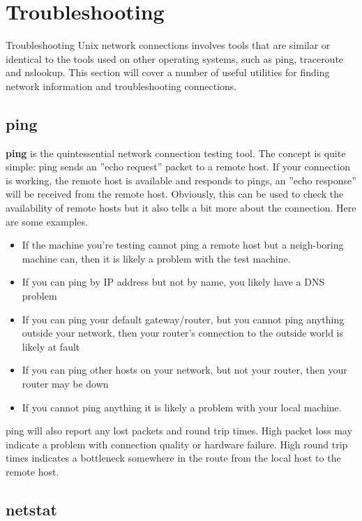 \section{Troubleshooting}

Troubleshooting Unix network connections involves tools that are similar or identical to the tools used on other operating systems, such as ping, traceroute and nslookup. This section will cover a number of useful utilities for finding network information and troubleshooting connections.

\subsection{ping}

\textbf{ping} is the quintessential network connection testing tool. The concept is quite simple: ping sends an ”echo request” packet to a remote host. If your connection is working, the remote host is available and responds to pings, an ”echo response” will be received from the remote host. Obviously, this can be used to check the availability of remote hosts but it also tells a bit more about the connection. Here are some examples.

\begin{itemize}
    \item If the machine you’re testing cannot ping a remote host but a neigh-boring machine can, then it is likely a problem with the test machine.
    \item If you can ping by IP address but not by name, you likely have a DNS problem
    \item If you can ping your default gateway/router, but you cannot ping anything outside your network, then your router’s connection to the outside world is likely at fault
    \item If you can ping other hosts on your network, but not your router, then your router may be down
    \item If you cannot ping anything it is likely a problem with your local machine. 
\end{itemize}

ping will also report any lost packets and round trip times. High packet loss may indicate a problem with connection quality or hardware failure. High round trip times indicates a bottleneck somewhere in the route from the local host to the remote host.

\subsection{netstat}


